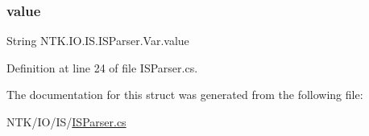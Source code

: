 \subsubsection{\texorpdfstring{value}{value}}
{\footnotesize\ttfamily String N\+T\+K.\+I\+O.\+I\+S.\+I\+S\+Parser.\+Var.\+value}



Definition at line 24 of file I\+S\+Parser.\+cs.



The documentation for this struct was generated from the following file\+:\begin{DoxyCompactItemize}
\item 
N\+T\+K/\+I\+O/\+I\+S/\mbox{\hyperlink{_i_s_parser_8cs}{I\+S\+Parser.\+cs}}\end{DoxyCompactItemize}
